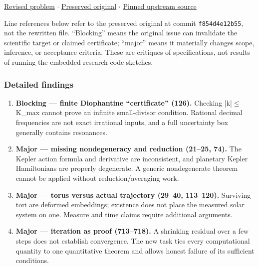 \documentclass[
  11pt,
]{article}
\begin{document}
\href{https://github.com/rick-stevens-ai/Pure-Thought/blob/main/PRDs/26-KAM-Theory-Planetary-Stability.md}{Revised
problem} \ensuremath{\cdot}
\href{https://github.com/rick-stevens-ai/Pure-Thought/blob/main/archive/original-PRDs/26-KAM-Theory-Planetary-Stability.md}{Preserved
original} \ensuremath{\cdot}
\href{https://github.com/rick-stevens-ai/Pure-Thought/blob/f854d4e12b55c1f5b5c2a964b75f2d23496d981e/PRDs/26-KAM-Theory-Planetary-Stability.md}{Pinned
upstream source}

Line references below refer to the preserved original at commit
\texttt{f854d4e12b55}, not the rewritten file. ``Blocking'' means the
original issue can invalidate the scientific target or claimed
certificate; ``major'' means it materially changes scope, inference, or
acceptance criteria. These are critiques of specifications, not results
of running the embedded research-code sketches.

\subsubsection{Detailed findings}

\begin{enumerate}
\def\labelenumi{\arabic{enumi}.}
\item
  \textbf{Blocking --- finite Diophantine ``certificate'' (126).}
  Checking |k|\ensuremath{\le}K\_max cannot prove an infinite
  small-divisor condition. Rational decimal frequencies are not exact
  irrational inputs, and a full uncertainty box generally contains
  resonances.
\item
  \textbf{Major --- missing nondegeneracy and reduction (21--25, 74).}
  The Kepler action formula and derivative are inconsistent, and
  planetary Kepler Hamiltonians are properly degenerate. A generic
  nondegenerate theorem cannot be applied without reduction/averaging
  work.
\item
  \textbf{Major --- torus versus actual trajectory (29--40, 113--120).}
  Surviving tori are deformed embeddings; existence does not place the
  measured solar system on one. Measure and time claims require
  additional arguments.
\item
  \textbf{Major --- iteration as proof (713--718).} A shrinking residual
  over a few steps does not establish convergence. The new task ties
  every computational quantity to one quantitative theorem and allows
  honest failure of its sufficient conditions.
\end{enumerate}
\end{document}
